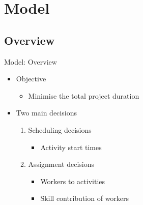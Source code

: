 \documentclass{beamer}
\begin{document}
\section{Model}
\subsection{Overview}
\begin{frame}{Model: Overview}
	\begin{itemize}
		\item \pause Objective
		\begin{itemize}
			\item Minimise the total project duration\pause
		\end{itemize}
	\end{itemize}
	\vspace{5mm}
	\begin{itemize}
		\item Two main decisions\pause
		\vspace{2mm}
		\begin{enumerate}
			\item Scheduling decisions
			\begin{itemize}
				\item Activity start times\pause
			\end{itemize}
			\vspace{2mm}
			\item Assignment decisions
			\begin{itemize}
				\item Workers to activities
				\vspace{1mm}
				\item Skill contribution of workers
			\end{itemize}
		\end{enumerate}
	\end{itemize}
\end{frame}
\end{document}
